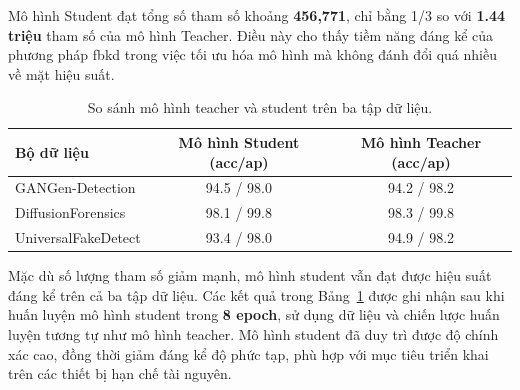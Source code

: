 Mô hình Student đạt tổng số tham số khoảng \textbf{456,771}, chỉ bằng {1/3} so với \textbf{1.44 triệu} tham số của mô hình Teacher. Điều này cho thấy tiềm năng đáng kể của phương pháp \gls{fbkd} trong việc tối ưu hóa mô hình mà không đánh đổi quá nhiều về mặt hiệu suất.
%
\begin{table}[h!]
	\centering
	\caption{So sánh mô hình \Gls{teacher} và \Gls{student} trên ba tập dữ liệu.}
	\label{tab:teacher_student_comparison}
	\begin{adjustbox}{max width=\textwidth}
		\setlength{\tabcolsep}{12pt} %
		\renewcommand{\arraystretch}{1.2} %
		\begin{tabular}{l c c}
			\toprule
			\textbf{Bộ dữ liệu} &
			\textbf{Mô hình Student (acc/ap)} &
			\textbf{Mô hình Teacher (acc/ap)} \\
			\midrule
			GANGen-Detection      & 94.5 / 98.0        & 94.2 / 98.2 \\
			DiffusionForensics    & {98.1 / 99.8} & 98.3 / 99.8 \\
			UniversalFakeDetect   & {93.4 / 98.0}  & 94.9 / 98.2 \\
			\bottomrule
		\end{tabular}
	\end{adjustbox}
\end{table}
%
Mặc dù số lượng tham số giảm mạnh, mô hình \Gls{student} vẫn đạt được hiệu suất đáng kể trên cả ba tập dữ liệu. Các kết quả trong Bảng~\ref{tab:teacher_student_comparison} được ghi nhận sau khi huấn luyện mô hình \Gls{student} trong \textbf{8 epoch}, sử dụng dữ liệu và chiến lược huấn luyện tương tự như mô hình \Gls{teacher}.
%
Mô hình \Gls{student} đã duy trì được độ chính xác cao, đồng thời giảm đáng kể độ phức tạp, phù hợp với mục tiêu triển khai trên các thiết bị hạn chế tài nguyên.






